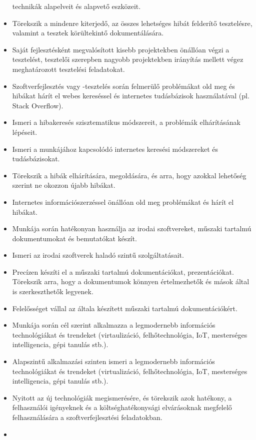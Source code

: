 \begin{itemize}
  technikák alapelveit és alapvető eszközeit.
\item
  Törekszik a mindenre kiterjedő, az összes lehetséges hibát felderítő
  tesztelésre, valamint a tesztek körültekintő dokumentálására.
\item
  Saját fejlesztésként megvalósított kisebb projektekben önállóan végzi
  a tesztelést, tesztelői szerepben nagyobb projektekben irányítás
  mellett végez meghatározott tesztelési feladatokat.
\item
  Szoftverfejlesztés vagy -tesztelés során felmerülő problémákat old meg
  és hibákat hárít el webes kereséssel és internetes tudásbázisok
  használatával (pl. Stack Overflow).
\item
  Ismeri a hibakeresés szisztematikus módszereit, a problémák
  elhárításának lépéseit.
\item
  Ismeri a munkájához kapcsolódó internetes keresési módszereket és
  tudásbázisokat.
\item
  Törekszik a hibák elhárítására, megoldására, és arra, hogy azokkal
  lehetőség szerint ne okozzon újabb hibákat.
\item
  Internetes információszerzéssel önállóan old meg problémákat és hárít
  el hibákat.
\item
  Munkája során hatékonyan használja az irodai szoftvereket, műszaki
  tartalmú dokumentumokat és bemutatókat készít.
\item
  Ismeri az irodai szoftverek haladó szintű szolgáltatásait.
\item
  Precízen készíti el a műszaki tartalmú dokumentációkat,
  prezentációkat. Törekszik arra, hogy a dokumentumok könnyen
  értelmezhetők és mások által is szerkeszthetők legyenek.
\item
  Felelősséget vállal az általa készített műszaki tartalmú
  dokumentációkért.
\item
  Munkája során cél szerint alkalmazza a legmodernebb információs
  technológiákat és trendeket (virtaulizáció, felhőtechnológia, IoT,
  mesterséges intelligencia, gépi tanulás stb.).
\item
  Alapszintű alkalmazási szinten ismeri a legmodernebb információs
  technológiákat és trendeket (virtualizáció, felhőtechnológia, IoT,
  mesterséges intelligencia, gépi tanulás stb.).
\item
  Nyitott az új technológiák megismerésére, és törekszik azok hatékony,
  a felhasználói igényeknek és a költséghatékonysági elvárásoknak
  megfelelő felhasználására a szoftverfejlesztési feladatokban.
\item

\end{itemize}
